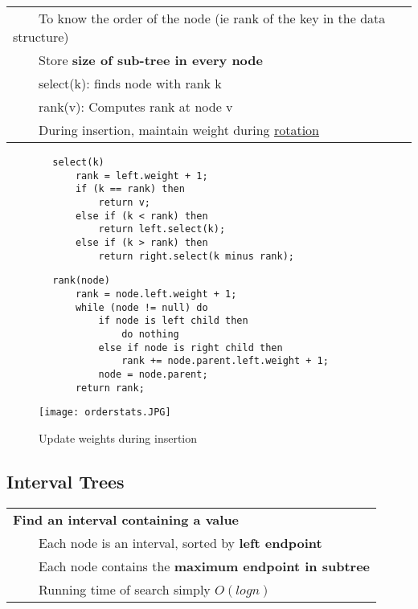 \documentclass{article}
\newcommand{\tabitem}{~~\llap{\textbullet}~~}
\begin{document}
    \begin{tabular}{l}
        \tabitem To know the order of the node (ie rank of the key in the data structure)\\
        \tabitem Store \textbf{size of sub-tree in every node}\\
        \tabitem select(k): finds node with rank k\\
        \tabitem rank(v): Computes rank at node v\\
        \tabitem During insertion, maintain weight during \hyperref[orderstats]{rotation}
    \end{tabular}

    \begin{verbatim}
        select(k)
            rank = left.weight + 1;
            if (k == rank) then
                return v;
            else if (k < rank) then
                return left.select(k);
            else if (k > rank) then
                return right.select(k minus rank);
    \end{verbatim}

    \begin{verbatim}
        rank(node)
            rank = node.left.weight + 1;
            while (node != null) do
                if node is left child then
                    do nothing
                else if node is right child then
                    rank += node.parent.left.weight + 1;
                node = node.parent;
            return rank;
    \end{verbatim}

    \begin{figure}[htbp]
        \begin{center}
        \texttt{[image: orderstats.JPG]}
        \caption{Update weights during insertion}
        \label{orderstats}
        \end{center}
    \end{figure}

    \pagebreak

    \subsection{Interval Trees}

    \begin{tabular}{l}
        \textbf{Find an interval containing a value}\\
        \tabitem Each node is an interval, sorted by \textbf{left endpoint}\\
        \tabitem Each node contains the \textbf{maximum endpoint in subtree}\\
        \tabitem Running time of search simply $O(logn)$\\
    \end{tabular}
\end{document}
